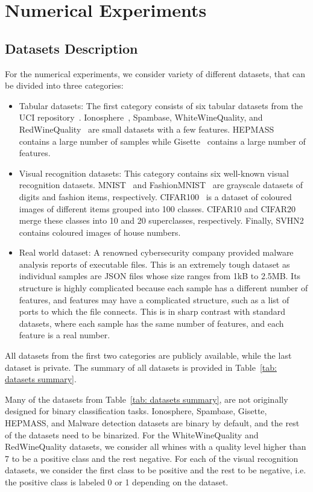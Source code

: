 \chapter{Numerical Experiments}\label{chap: experiments}

\section{Datasets Description}

For the numerical experiments, we consider variety of different datasets, that can be divided
into three categories:
\begin{itemize}
  \item Tabular datasets: The first category consists of six tabular datasets from the UCI repository~\cite{dua2019uci}. Ionosphere~\cite{sigillito1989classification}, Spambase, WhiteWineQuality, and RedWineQuality~\cite{cortez2009modeling} are small datasets with a few features. HEPMASS~\cite{baldi2016parameterized} contains a large number of samples while Gisette~\cite{guyon2005result} contains a large number of features.
  \item Visual recognition datasets: This category contains six well-known visual recognition datasets. MNIST~\cite{deng2012mnist} and FashionMNIST~\cite{xiao2017fashionmnist} are grayscale datasets of digits and fashion items, respectively. CIFAR100~\cite{krizhevsky2009learning} is a dataset of coloured images of different items grouped into 100 classes. CIFAR10 and CIFAR20 merge these classes into 10 and 20 superclasses, respectively. Finally, SVHN2~\cite{netzer2011reading} contains coloured images of house numbers.
  \item Real world dataset: A renowned cybersecurity company provided malware analysis reports of executable files. This is an extremely tough dataset as individual samples are JSON files whose size ranges from 1kB to 2.5MB. Its structure is highly complicated because each sample has a different number of features, and features may have a complicated structure, such as a list of ports to which the file connects. This is in sharp contrast with standard datasets, where each sample has the same number of features, and each feature is a real number.
\end{itemize}
All datasets from the first two categories are publicly available, while the last dataset is private. The summary of all datasets is provided in Table~\ref{tab: datasets summary}.

Many of the datasets from Table~\ref{tab: datasets summary}, are not originally designed for binary classification tasks. Ionosphere, Spambase, Gisette, HEPMASS, and Malware detection datasets are binary by default, and the rest of the datasets need to be binarized. For the WhiteWineQuality and RedWineQuality datasets, we consider all whines with a quality level higher than 7 to be a positive class and the rest negative. For each of the visual recognition datasets, we consider the first class to be positive and the rest to be negative, i.e. the positive class is labeled 0 or 1 depending on the dataset.

